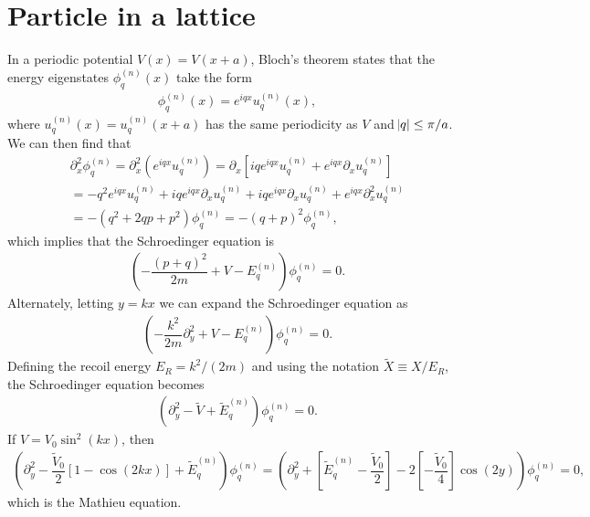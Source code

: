 \documentclass[aps,notitlepage,nofootinbib,10pt]{revtex4-1}
\newcommand{\f}[2]{\dfrac{#1}{#2}} %
\newcommand{\p}[1]{\left(#1\right)} %
\renewcommand{\sp}[1]{\left[#1\right]} %
\renewcommand{\d}{\partial} %
\newcommand{\1}{\mathds{1}}
\begin{document}

\section{Particle in a lattice}

In a periodic potential $V\p{x}=V\p{x+a}$, Bloch's theorem states
that the energy eigenstates $\phi^{\p n}_q\p{x}$ take the form
\begin{align}
  \phi^{\p n}_q\p{x} = e^{iqx} u^{\p n}_q\p{x},
\end{align}
where $u^{\p n}_q\p{x}=u^{\p n}_q\p{x+a}$ has the same periodicity as
$V$ and $\abs{q}\le\pi/a$. We can then find that
\begin{multline}
  \d_x^2\phi^{\p n}_q
  = \d_x^2\p{e^{iqx} u^{\p n}_q}
  = \d_x\sp{iqe^{iqx} u^{\p n}_q + e^{iqx}\d_xu^{\p n}_q} \\
  = -q^2e^{iqx}u^{\p n}_q + iqe^{iqx} \d_xu^{\p n}_q
  + iqe^{iqx} \d_xu^{\p n}_q + e^{iqx}\d_x^2u^{\p n}_q \\
  = -\p{q^2 + 2qp + p^2}\phi^{\p n}_q
  = -\p{q+p}^2\phi^{\p n}_q,
\end{multline}
which implies that the Schroedinger equation is
\begin{align}
  \p{-\f{\p{p+q}^2}{2m} + V - E_q^{\p n}}\phi^{\p n}_q = 0.
\end{align}
Alternately, letting $y=kx$ we can expand the Schroedinger equation as
\begin{align}
  \p{-\f{k^2}{2m}\d_y^2 + V - E_q^{\p n}}\phi^{\p n}_q = 0.
\end{align}
Defining the recoil energy $E_R=k^2/\p{2m}$ and using the notation
$\tilde X\equiv X/E_R$, the Schroedinger equation becomes
\begin{align}
  \p{\d_y^2 - \tilde V + \tilde E_q^{\p n}}\phi^{\p n}_q = 0.
\end{align}
If $V=V_0\sin^2\p{kx}$, then
\begin{align}
  \p{\d_y^2 - \f{\tilde V_0}{2}\sp{1-\cos\p{2kx}}
  + \tilde E_q^{\p n}}\phi^{\p n}_q
  = \p{\d_y^2 + \sp{\tilde E_q^{\p n} - \f{\tilde V_0}{2}} -
  2\sp{-\f{\tilde V_0}{4}}\cos\p{2y}}\phi^{\p n}_q = 0,
\end{align}
which is the Mathieu equation.
\end{document}
